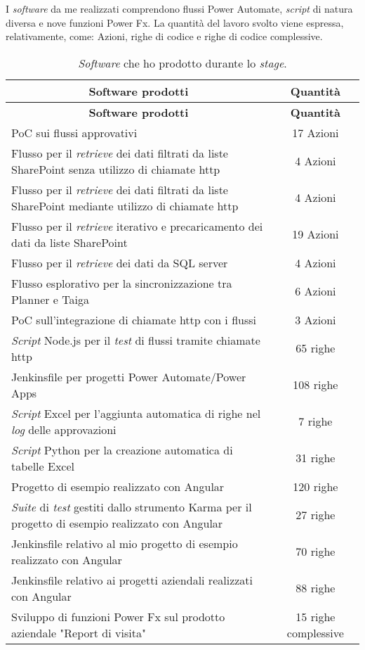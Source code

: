 \noindent I \emph{software} da me realizzati comprendono flussi Power Automate, \emph{script} di natura diversa e nove funzioni Power Fx.
La quantità del lavoro svolto viene espressa, relativamente, come: Azioni, righe di codice e righe di codice complessive.
\begingroup
\renewcommand\arraystretch{1.3}
\begin{longtable}{|p{9cm}|c|}
    \caption{\emph{Software} che ho prodotto durante lo \emph{stage}.}
    \label{tab:risultatiQuantitativi}\\
    \hline \multicolumn{1}{|c|}{\textbf{Software prodotti}} & \multicolumn{1}{|c|}{\textbf{Quantità}}\\  \endfirsthead
    \hline \multicolumn{1}{|c|}{\textbf{Software prodotti}} & \multicolumn{1}{|c|}{\textbf{Quantità}}\\  \endhead
    \endfoot
    \hline \endlastfoot
    \hline PoC sui flussi approvativi & 17 Azioni\\
    \hline Flusso per il \emph{retrieve} dei dati filtrati da liste SharePoint senza utilizzo di chiamate \gls{http} & 4 Azioni\\
    \hline Flusso per il \emph{retrieve} dei dati filtrati da liste SharePoint mediante utilizzo di chiamate \gls{http} & 4 Azioni\\
    \hline Flusso per il \emph{retrieve} iterativo e precaricamento dei dati da liste SharePoint & 19 Azioni\\
    \hline Flusso per il \emph{retrieve} dei dati da SQL server & 4 Azioni\\
    \hline Flusso esplorativo per la sincronizzazione tra Planner e Taiga & 6 Azioni\\
    \hline PoC sull'integrazione di chiamate \gls{http} con i flussi & 3 Azioni\\
    \hline \emph{Script} Node.js per il \emph{test} di flussi tramite chiamate \gls{http} & 65 righe\\
    \hline Jenkinsfile per progetti Power Automate/Power Apps & 108 righe\\
    \hline \emph{Script} Excel per l'aggiunta automatica di righe nel \emph{log} delle approvazioni & 7 righe\\
    \hline \emph{Script} Python per la creazione automatica di tabelle Excel & 31 righe\\
    \hline Progetto di esempio realizzato con Angular & 120 righe\\
    \hline \emph{Suite} di \emph{test} gestiti dallo strumento Karma per il progetto di esempio realizzato con Angular & 27 righe\\
    \hline Jenkinsfile relativo al mio progetto di esempio realizzato con Angular & 70 righe\\
    \hline Jenkinsfile relativo ai progetti aziendali realizzati con Angular & 88 righe\\
    \hline Sviluppo di funzioni Power Fx sul prodotto aziendale "Report di visita" &  15 righe complessive\\
\end{longtable}
\endgroup